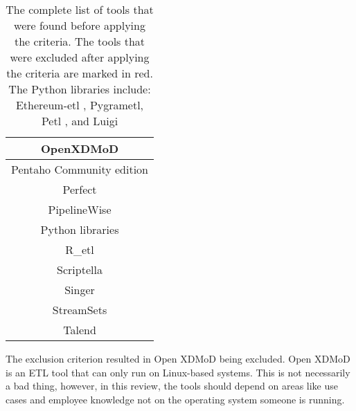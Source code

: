 \documentclass[11pt]{article}
\begin{document}
\begin{table}[H]
\begin{tabular}{|c|}
        {\color[HTML]{FE0000} OpenXDMoD \cite{Dean2022}} \\ \hline
        Pentaho Community edition \cite{Sreemathy20211650, Fang2022, Zheng2023} \\ \hline
        Perfect \\ \hline
        PipelineWise \\ \hline
        Python libraries\text{*} \cite{Fissore2018267} \\ \hline
        R\_etl \cite{Biswas_programming2019267, Biswas_realtime202053} \\ \hline
        {\color[HTML]{FE0000} Scriptella \cite{Biswas_programming2019267, Biswas_realtime202053}} \\ \hline
        Singer\\ \hline
        {\color[HTML]{FE0000} StreamSets \cite{Sreemathy20211650}} \\ \hline
        {\color[HTML]{FE0000} Talend \cite{Espinoza2023, Sreemathy20211650}} \\ \hline
    \end{tabular}
    \caption{The complete list of tools that were found before applying the criteria. The tools that were excluded after applying the criteria are marked in red. \\
    \text{*}The Python libraries include: Ethereum-etl \cite{Camozzi2022}, Pygrametl\cite{Thomsen201821, Jensen202145, Biswas_programming2019267, Biswas_realtime202053}, Petl \cite{Biswas_programming2019267, Biswas_realtime202053}, and Luigi}
\label{table:tools}
\end{table}

The exclusion criterion resulted in Open XDMoD being excluded. Open XDMoD is an ETL tool that can only run on Linux-based systems. This is not necessarily a bad thing, however, in this review, the tools should depend on areas like use cases and employee knowledge not on the operating system someone is running. \\
\end{document}
